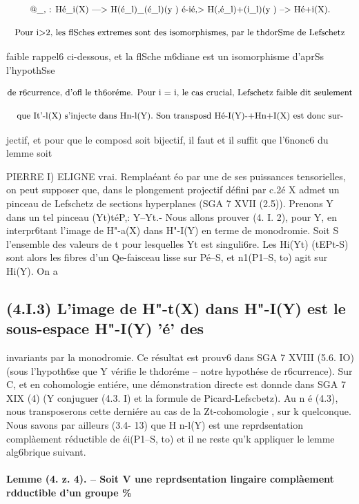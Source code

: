 \documentclass[11pt]{article}
\theoremstyle{remark}
\begin{document}
\[\text{\small @\_, : Hé\_i(X) ---> H(é\_l)\_(é\_l)(y ) é-ié,> H(,é\_l)+(i\_l)(y ) --> Hé+i(X).}\]

\[\text{\small Pour i>2, les flSches extremes sont des isomorphismes, par le thdorSme de Lefschetz}\]

faible rappel6 ci-dessous, et la flSche m6diane est un isomorphisme d'aprSs l'hypothSse

\[\text{\small de r6currence, d'ofl le th6oréme. Pour i = i, le cas crucial, Lefschetz faible dit seulement}\]

\[\text{\small que It'-l(X) s'injecte dans Hn-l(Y). Son transposd Hé-I(Y)-+Hn+I(X) est donc sur-}\]

jectif, et pour que le composd soit bijectif, il faut et il suffit que l'6nonc6 du lemme soit

PIERRE I) ELIGNE vrai. Remplaéant éo par une de ses puissances tensorielles, on peut supposer que, dans le plongement projectif défini par c.2é X admet un pinceau de Lefschetz de sections hyperplanes (SGA 7 XVII (2.5)). Prenons Y dans un tel pinceau (Yt)téP,: Y--Yt.- Nous allons prouver (4. I. 2), pour Y, en interpr6tant l'image de H"-a(X) dans H"-I(Y) en terme de monodromie. Soit S l'ensemble des valeurs de t pour lesquelles Yt est singuli6re. Les Hi(Yt) (tEPt-S) sont alors les fibres d'un Qe-faisceau lisse sur Pé--S, et n1(P1--S, to) agit sur Hi(Y). On a

\subsection*{(4.I.3) L'image de H"-t(X) dans H"-I(Y) est le sous-espace H"-I(Y) 'é' des}

invariants par la monodromie. Ce résultat est prouv6 dans SGA 7 XVIII (5.6. IO) (sous l'hypoth6se que Y vérifie le thdoréme -- notre hypothése de r6currence). Sur C, et en cohomologie entiére, une démonstration directe est donnde dans SGA 7 XIX (4) (Y conjuguer (4.3. I) et la formule de Picard-Lefscbetz). Au n é (4.3), nous transposerons cette derniére au cas de la Zt-cohomologie , sur k quelconque. Nous savons par ailleurs (3.4- 13) que H n-l(Y) est une reprdsentation complàement réductible de éi(P1--S, to) et il ne reste qu'k appliquer le lemme alg6brique suivant.

\paragraph{Lemme (4. z. 4). -- Soit V une reprdsentation lingaire complàement rdductible d'un groupe \%}
\end{document}
